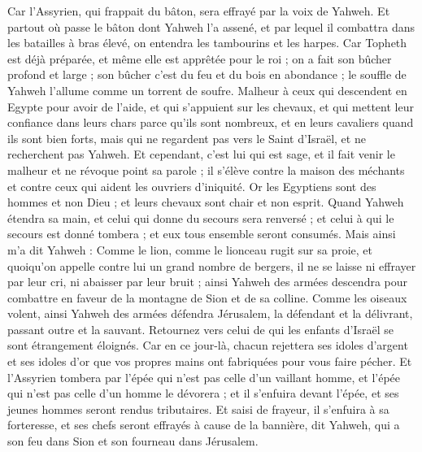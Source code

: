 \begin{multicols}{2}
Car l'Assyrien, qui frappait du bâton, sera effrayé par la voix de Yahweh.
Et partout où passe le bâton dont Yahweh l'a assené, et par lequel il combattra dans les batailles à bras élevé, on entendra les tambourins et les harpes.
Car Topheth est déjà préparée, et même elle est apprêtée pour le roi ; on a fait son bûcher profond et large ; son bûcher c'est du feu et du bois en abondance ; le souffle de Yahweh l'allume comme un torrent de soufre.
\VerseOne{}Malheur à ceux qui descendent en Egypte pour avoir de l'aide, et qui s'appuient sur les chevaux, et qui mettent leur confiance dans leurs chars parce qu'ils sont nombreux, et en leurs cavaliers quand ils sont bien forts, mais qui ne regardent pas vers le Saint d'Israël, et ne recherchent pas Yahweh.
Et cependant, c'est lui qui est sage, et il fait venir le malheur et ne révoque point sa parole ; il s'élève contre la maison des méchants et contre ceux qui aident les ouvriers d'iniquité.
Or les Egyptiens sont des hommes et non Dieu ; et leurs chevaux sont chair et non esprit. Quand Yahweh étendra sa main, et celui qui donne du secours sera renversé ; et celui à qui le secours est donné tombera ; et eux tous ensemble seront consumés.
Mais ainsi m'a dit Yahweh : Comme le lion, comme le lionceau rugit sur sa proie, et quoiqu'on appelle contre lui un grand nombre de bergers, il ne se laisse ni effrayer par leur cri, ni abaisser par leur bruit ; ainsi Yahweh des armées descendra pour combattre en faveur de la montagne de Sion et de sa colline.
Comme les oiseaux volent, ainsi Yahweh des armées défendra Jérusalem, la défendant et la délivrant, passant outre et la sauvant.
Retournez vers celui de qui les enfants d'Israël se sont étrangement éloignés.
Car en ce jour-là, chacun rejettera ses idoles d'argent et ses idoles d'or que vos propres mains ont fabriquées pour vous faire pécher.
Et l'Assyrien tombera par l'épée qui n'est pas celle d'un vaillant homme, et l'épée qui n'est pas celle d'un homme le dévorera ; et il s'enfuira devant l'épée, et ses jeunes hommes seront rendus tributaires.
Et saisi de frayeur, il s'enfuira à sa forteresse, et ses chefs seront effrayés à cause de la bannière, dit Yahweh, qui a son feu dans Sion et son fourneau dans Jérusalem.

\end{multicols}
